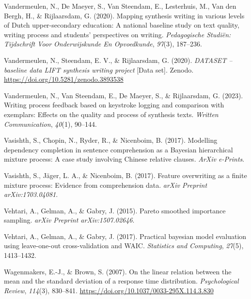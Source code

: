 \documentclass[
  man,floatsintext]{apa7}
\newlength{\cslhangindent}
\newlength{\cslentryspacingunit} %
\newenvironment{CSLReferences}[2] %
 {%
  \setlength{\parindent}{0pt}
  \ifodd #1
  \let\oldpar\par
  \def\par{\hangindent=\cslhangindent\oldpar}
  \fi
  \setlength{\parskip}{#2\cslentryspacingunit}
 }%
 {}
\begin{document}
\begin{CSLReferences}{1}{0}
\leavevmode{}%
Vandermeulen, N., De Maeyer, S., Van Steendam, E., Lesterhuis, M., Van den Bergh, H., \& Rijlaarsdam, G. (2020). Mapping synthesis writing in various levels of {Dutch} upper-secondary education: A national baseline study on text quality, writing process and students' perspectives on writing. \emph{Pedagogische Studiën: Tijdschrift Voor Onderwijskunde En Opvoedkunde}, \emph{97}(3), 187--236.

\leavevmode{}%
Vandermeulen, N., Steendam, E. V., \& Rijlaarsdam, G. (2020). \emph{{DATASET} -- baseline data {LIFT} synthesis writing project} {[}Data set{]}. Zenodo. \url{https://doi.org/10.5281/zenodo.3893538}

\leavevmode{}%
Vandermeulen, N., Van Steendam, E., De Maeyer, S., \& Rijlaarsdam, G. (2023). Writing process feedback based on keystroke logging and comparison with exemplars: Effects on the quality and process of synthesis texts. \emph{Written Communication}, \emph{40}(1), 90--144.

\leavevmode{}%
Vasishth, S., Chopin, N., Ryder, R., \& Nicenboim, B. (2017). Modelling dependency completion in sentence comprehension as a {B}ayesian hierarchical mixture process: {A} case study involving {C}hinese relative clauses. \emph{ArXiv e-Prints}.

\leavevmode{}%
Vasishth, S., Jäger, L. A., \& Nicenboim, B. (2017). Feature overwriting as a finite mixture process: Evidence from comprehension data. \emph{arXiv Preprint arXiv:1703.04081}.

\leavevmode{}%
Vehtari, A., Gelman, A., \& Gabry, J. (2015). Pareto smoothed importance sampling. \emph{arXiv Preprint arXiv:1507.02646}.

\leavevmode{}%
Vehtari, A., Gelman, A., \& Gabry, J. (2017). Practical bayesian model evaluation using leave-one-out cross-validation and {WAIC}. \emph{Statistics and Computing}, \emph{27}(5), 1413--1432.

\leavevmode{}%
Wagenmakers, E.-J., \& Brown, S. (2007). On the linear relation between the mean and the standard deviation of a response time distribution. \emph{Psychological Review}, \emph{114}(3), 830--841. \url{https://doi.org/10.1037/0033-295X.114.3.830}


\end{CSLReferences}
\end{document}
